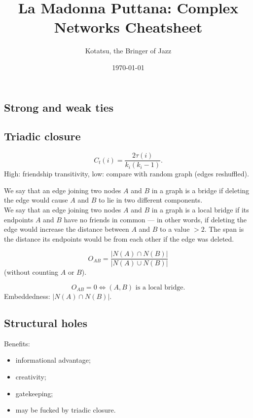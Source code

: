 \documentclass[a4paper,9pt]{extarticle}
\title{La Madonna Puttana: Complex Networks Cheatsheet}
\author{\usym{1F3BC}\;Kotatsu, the Bringer of Jazz\;\usym{1F3B9}}
\date{\today}
\begin{document}
	
	\maketitle
	
	\begin{multicols*}{2}
	\section{Strong and weak ties}
	\subsection{Triadic closure}
	\begin{riquadro}
		$$C_{t}(i)=\frac{2\tau(i)}{k_{i}(k_{i}-1)}.$$
		High: friendship transitivity, low: compare with random graph (edges reshuffled).
	\end{riquadro}
	We say that an edge joining two nodes $A$ and $B$ in a graph is a bridge if deleting the edge
	would cause $A$ and $B$ to lie in two different components.\\
	We say that an edge joining two nodes $A$ and $B$ in a graph is a local bridge if its
	endpoints $A$ and $B$ have no friends in common — in other words, if deleting the edge
	would increase the distance between $A$ and $B$ to a value $> 2$. The span is the distance its endpoints would be from each other if the edge was deleted.
	\begin{riquadro}
		\begin{equation*}
			O_{AB}=\frac{|N(A)\cap N(B)|}{|N(A)\cup N(B)|}
		\end{equation*}
		(without counting $A$ or $B$).
	\end{riquadro}
	\begin{equation*}
		O_{AB}=0\iff(A,B)\text{ is a local bridge}.
	\end{equation*}
	Embeddedness: $|N(A)\cap N(B)|$.
	\subsection{Structural holes}
	Benefits:
	\begin{itemize}
		\item informational advantage;
		\item creativity;
		\item gatekeeping;
		\item may be fucked by triadic closure.
	\end{itemize}

\end{multicols*}
\end{document}
